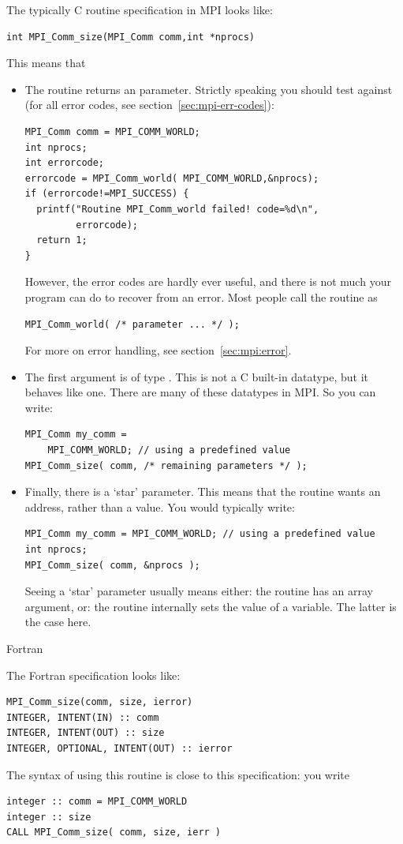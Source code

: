 The typically C routine specification in MPI looks like:
\begin{lstlisting}
int MPI_Comm_size(MPI_Comm comm,int *nprocs)
\end{lstlisting}
This means that
\begin{itemize}
\item The routine returns an  parameter. Strictly speaking you
  should test against  (for all error codes,
  see section~\ref{sec:mpi-err-codes}):
\begin{lstlisting}
MPI_Comm comm = MPI_COMM_WORLD;
int nprocs;
int errorcode;
errorcode = MPI_Comm_world( MPI_COMM_WORLD,&nprocs);
if (errorcode!=MPI_SUCCESS) {
  printf("Routine MPI_Comm_world failed! code=%d\n",
         errorcode);
  return 1;
}
\end{lstlisting}
  However, the error codes are hardly ever useful, and there is not
  much your program can do to recover from an error. Most people call
  the routine as
\begin{lstlisting}
MPI_Comm_world( /* parameter ... */ );
\end{lstlisting}
For more on error handling, see section~\ref{sec:mpi:error}.
\item The first argument is of type . This is not a C
  built-in datatype, but it behaves like one. There are many of these
   datatypes in MPI. So you can write:
\begin{lstlisting}
MPI_Comm my_comm =
    MPI_COMM_WORLD; // using a predefined value
MPI_Comm_size( comm, /* remaining parameters */ );
\end{lstlisting}
\item Finally, there is a `star' parameter. This means that the
  routine wants an address, rather than a value. You would typically write:
\begin{lstlisting}
MPI_Comm my_comm = MPI_COMM_WORLD; // using a predefined value
int nprocs;
MPI_Comm_size( comm, &nprocs );
\end{lstlisting}
  Seeing a `star' parameter usually means either: the routine has an
  array argument, or: the routine internally sets the value of a
  variable. The latter is the case here.
\end{itemize}

 {Fortran}

The Fortran specification looks like:
\lstset{language=Fortran} %
\begin{lstlisting}
MPI_Comm_size(comm, size, ierror)
INTEGER, INTENT(IN) :: comm
INTEGER, INTENT(OUT) :: size
INTEGER, OPTIONAL, INTENT(OUT) :: ierror
\end{lstlisting}
The syntax of using this routine is close to this specification: you
write
\begin{lstlisting}
integer :: comm = MPI_COMM_WORLD
integer :: size
CALL MPI_Comm_size( comm, size, ierr )
\end{lstlisting}
\lstset{language=C} %

